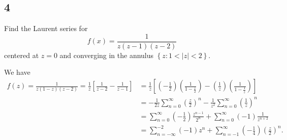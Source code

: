 \documentclass[12pt]{article}
\begin{document}
\newpage
\subsection*{4}
\begin{tcolorbox}
Find the Laurent series for
\[ f(x) = \frac{1}{z(z-1)(z-2)} \]
centered at $z = 0$ and converging in the annulus $\left\{ z : 1 < |z| < 2 \right\}$.
\end{tcolorbox}
We have
\begin{align*}
f(z) = \frac{1}{z(1-z)(z-2)} = \frac{1}{z}\left[ \frac{1}{z - 2} - \frac{1}{z - 1} \right] & = \frac{1}{z}\left[
\left( -\frac{1}{2}\right)\left( \frac{1}{1 - \frac{z}{2}} \right)  - \left( \frac{1}{z} \right)\left( \frac{1}{1 - \frac{1}{z}} \right) \right] \\
& = -\frac{1}{2z}\sum_{n=0}^{\infty}\left( \frac{z}{2} \right)^{n} - \frac{1}{z^{2}}\sum_{n=0}^{\infty}\left( \frac{1}{z} \right)^{n} \\
& = \sum_{n=0}^{\infty}\left( -\frac{1}{2} \right)\frac{z^{n-1}}{2^{n}} + \sum_{n=0}^{\infty}(-1)\frac{1}{z^{n+2}} \\
& = \sum_{n=-\infty}^{-2}(-1)z^{n} + \sum_{n=-1}^{\infty}\left( -\frac{1}{4} \right)\left( \frac{z}{2} \right)^{n}.
\end{align*}

\newpage
\end{document}
